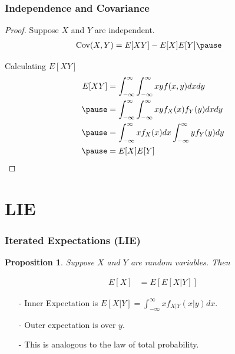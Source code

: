 \documentclass[aspectratio=169, handout]{beamer}
\newtheorem{prop}{Proposition}
\numberwithin{equation}{section}
\begin{document}
\begin{frame}
\frametitle{Independence and Covariance}
\begin{small}
\begin{proof}
Suppose $X$ and $Y$ are independent.  \pause 
\begin{align*}
\text{Cov}(X, Y) &= E[XY] - E[X]E[Y]   \pause 
\end{align*}

Calculating $E[XY]$ \pause 
\begin{align*}
E[XY] &= \int_{-\infty}^{\infty} \int_{-\infty}^{\infty} x y f(x,y)dxdy  \\ \pause 
& = \int_{-\infty}^{\infty} \int_{-\infty}^{\infty} x y f_{X}(x) f_{Y}(y)dxdy  \\ \pause 
&= \int_{-\infty}^{\infty} x f_{X}(x) dx \int_{-\infty}^{\infty} y f_{Y}(y) dy  \\ \pause 
&= E[X] E[Y]  
\end{align*}
\end{proof}

\end{small}
\end{frame}


\section{LIE}

\begin{frame}
\frametitle{Iterated Expectations (LIE)}

\begin{prop}
Suppose $X$ and $Y$ are random variables.  Then 

\begin{align*}
E[X] &= E[E[X|Y]]  
\end{align*}


\end{prop}


\begin{itemize}
\item[-] Inner Expectation is $E[X|Y] = \int_{-\infty}^{\infty} x f_{X|Y} (x|y) dx$.  
\item[-] Outer expectation is over $y$.  
\item[-] This is analogous to the law of total probability.
\end{itemize}


\end{frame}
\end{document}
